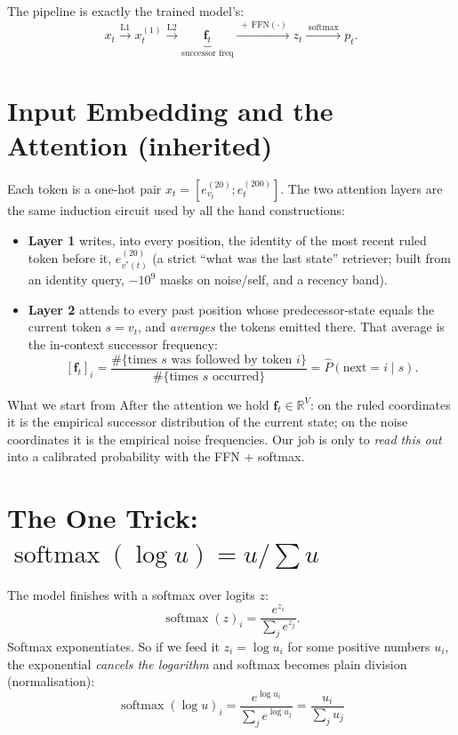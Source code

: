 \documentclass[11pt]{article}
\newcommand{\ev}[2]{e^{(#1)}_{#2}}
\newcommand{\R}{\mathbb{R}}
\newcommand{\fvec}{\mathbf{f}}
\newcommand{\vstar}{v^{*}}
\newcommand{\sm}{\operatorname{softmax}}
\begin{document}
The pipeline is exactly the trained model's:
$$
x_t \xrightarrow{\text{L1}} x^{(1)}_t \xrightarrow{\text{L2}} \underbrace{\fvec_t}_{\text{successor freq}}
\xrightarrow{\;+\,\mathrm{FFN}(\cdot)\;} z_t \xrightarrow{\;\sm\;} p_t .
$$

\section{Input Embedding and the Attention (inherited)}
Each token is a one-hot pair $x_t=[\ev{20}{v_t};\ev{200}{t}]$. The two attention layers are the same
induction circuit used by all the hand constructions:

\begin{itemize}[nosep,leftmargin=1.4em]
\item \textbf{Layer 1} writes, into every position, the identity of the most recent ruled token before
it, $\ev{20}{\vstar(t)}$ (a strict ``what was the last state'' retriever; built from an identity query,
$-10^9$ masks on noise/self, and a recency band).
\item \textbf{Layer 2} attends to every past position whose predecessor-state equals the current token
$s=v_t$, and \emph{averages} the tokens emitted there. That average is the in-context successor
frequency:
$$
[\fvec_t]_i=\frac{\#\{\text{times } s \text{ was followed by token } i\}}{\#\{\text{times } s \text{ occurred}\}}
=\widehat{P}(\text{next}=i\mid s).
$$
\end{itemize}

\begin{invbox}{What we start from}
After the attention we hold $\fvec_t\in\R^{V}$: on the ruled coordinates it is the empirical successor
distribution of the current state; on the noise coordinates it is the empirical noise frequencies. Our
job is only to \emph{read this out} into a calibrated probability with the FFN $+$ softmax.
\end{invbox}

\section{The One Trick: $\sm(\log u)=u/\sum u$}
The model finishes with a softmax over logits $z$:
$$
\sm(z)_i=\frac{e^{z_i}}{\sum_j e^{z_j}}.
$$
Softmax exponentiates. So if we feed it $z_i=\log u_i$ for some positive numbers $u_i$, the exponential
\emph{cancels the logarithm} and softmax becomes plain division (normalisation):
$$
\boxed{\;\sm(\log u)_i=\frac{e^{\log u_i}}{\sum_j e^{\log u_j}}=\frac{u_i}{\sum_j u_j}\;}
$$
\end{document}
